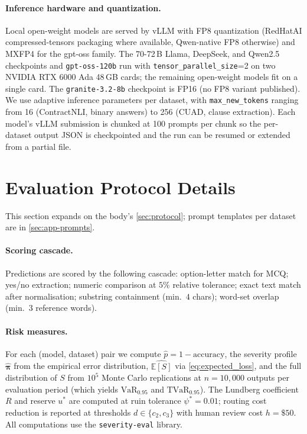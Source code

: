 \documentclass[11pt]{article}
\newcommand{\ES}{\mathbb{E}[S]}
\newcommand{\VaR}{\mathrm{VaR}}
\newcommand{\TVaR}{\mathrm{TVaR}}
\newcommand{\seveval}{\texttt{severity-eval}}
\newcommand{\bpi}{\boldsymbol{\pi}}
\begin{document}
\paragraph{Inference hardware and quantization.}
Local open-weight models are served by vLLM with FP8 quantization
(RedHatAI compressed-tensors packaging where available, Qwen-native
FP8 otherwise) and MXFP4 for the gpt-oss family. The
70-72\,B Llama, DeepSeek, and Qwen2.5 checkpoints and \texttt{gpt-oss-120b}
run with \texttt{tensor\_parallel\_size}=2 on two NVIDIA RTX 6000 Ada
48\,GB cards; the remaining open-weight models fit on a single card.
The \texttt{granite-3.2-8b} checkpoint is FP16 (no FP8 variant published). We
use adaptive inference parameters per dataset, with
\texttt{max\_new\_tokens} ranging from 16 (ContractNLI, binary
answers) to 256 (CUAD, clause extraction). Each model's vLLM
submission is chunked at 100 prompts per chunk so the per-dataset
output JSON is checkpointed and the run can be resumed or extended
from a partial file.

\section{Evaluation Protocol Details}
\label{sec:app-protocol}

This section expands on the body's \autoref{sec:protocol};
prompt templates per dataset are in \autoref{sec:app-prompts}.

\paragraph{Scoring cascade.}
Predictions are scored by the following cascade: option-letter
match for MCQ; yes/no extraction; numeric comparison at $5\%$
relative tolerance; exact text match after normalisation;
substring containment (min.\ $4$ chars); word-set overlap
(min.\ $3$ reference words).

\paragraph{Risk measures.}
For each (model, dataset) pair we compute
$\hat{p}{=}1{-}\mathrm{accuracy}$, the severity profile
$\hat{\bpi}$ from the empirical error distribution,
$\widehat{\ES}$ via \autoref{eq:expected_loss}, and the full
distribution of $S$ from $10^5$ Monte Carlo replications at
$n{=}10{,}000$ outputs per evaluation period (which yields
$\VaR_{0.95}$ and $\TVaR_{0.95}$). The Lundberg coefficient $R$
and reserve $u^\ast$ are computed at ruin tolerance
$\psi^\ast{=}0.01$; routing cost reduction is reported at
thresholds $d \in \{c_2, c_3\}$ with human review cost
$h{=}\$50$. All computations use the \seveval{} library.
\end{document}
